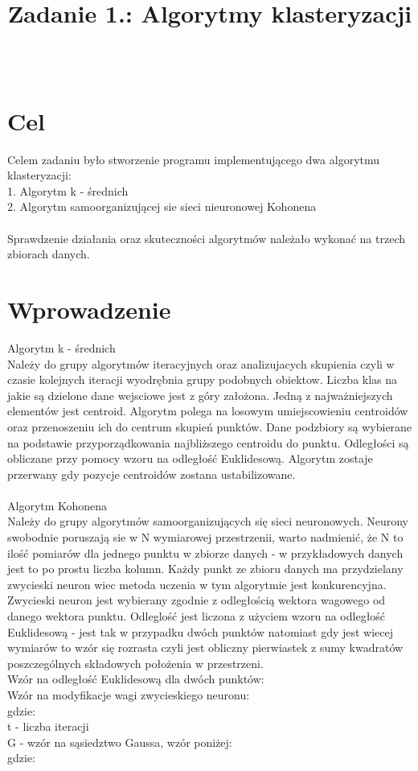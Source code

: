 \documentclass{classrep}
\author{%
  \studentinfo[216806@edu.p.lodz.pl]{Kamil Kowalewski}{216806}\\
  \studentinfo[216920@edu.p.lodz.pl]{Tomasz Witczak}{216920}%
}
\title{Zadanie 1.: Algorytmy klasteryzacji}
\begin{document}
\maketitle
\thispagestyle{fancyplain}

\section{Cel}
{Celem zadaniu było stworzenie programu implementującego dwa algorytmu klasteryzacji:\\
1. Algorytm k - średnich\\
2. Algorytm samoorganizującej sie sieci nieuronowej Kohonena\\\\
Sprawdzenie działania oraz skuteczności algorytmów należało wykonać na trzech zbiorach danych.
}

\section{Wprowadzenie}
{Algorytm k - średnich\\
Należy do grupy algorytmów iteracyjnych oraz analizujacych skupienia czyli w czasie kolejnych iteracji wyodrębnia grupy podobnych obiektow. Liczba klas na jakie są dzielone dane wejsciowe jest z góry założona. Jedną z najważniejszych elementów jest centroid. Algorytm polega na losowym umiejscowieniu centroidów oraz przenoszeniu ich do centrum skupień punktów. Dane podzbiory są wybierane na podstawie przyporządkowania najbliższego centroidu do punktu. Odległości są obliczane przy pomocy wzoru na odległość Euklidesową. Algorytm zostaje przerwany gdy pozycje centroidów zostana ustabilizowane.\\\\

Algorytm Kohonena\\
Należy do grupy algorytmów samoorganizujących się sieci neuronowych. Neurony swobodnie poruszają sie w N wymiarowej przestrzenii, warto nadmienić, że N to ilość pomiarów dla jednego punktu w zbiorze danych - w przykładowych danych jest to po prostu liczba kolumn. Każdy punkt ze zbioru danych ma przydzielany zwycieski neuron wiec metoda uczenia w tym algorytmie jest konkurencyjna. Zwycieski neuron jest wybierany zgodnie z odległością wektora wagowego od danego wektora punktu. Odleglość jest liczona z użyciem wzoru na odległość Euklidesową - jest tak w przypadku dwóch punktów natomiast gdy jest wiecej wymiarów to wzór się rozrasta czyli jest obliczny pierwiastek z sumy kwadratów poszczególnych składowych położenia w przestrzeni. \\

Wzór na odległość Euklidesową dla dwóch punktów: \\

Wzór na modyfikacje wagi zwycieskiego neuronu: \\
gdzie:\\
t - liczba iteracji\\
G - wzór na sąsiedztwo Gaussa, wzór poniżej:\\
gdzie:\\

}
\end{document}
